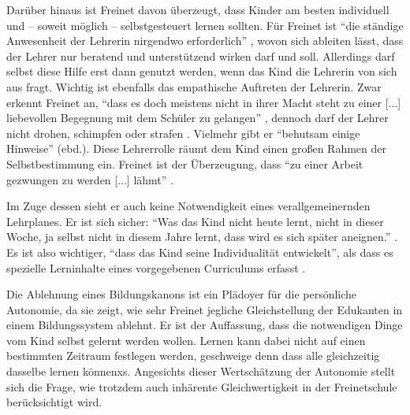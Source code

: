 Darüber hinaus ist Freinet davon überzeugt, dass Kinder am besten individuell und -- soweit möglich -- selbstgesteuert lernen sollten.
Für Freinet ist ``die ständige Anwesenheit der Lehrerin nirgendwo erforderlich'' \parencite[105]{Freinet1979}, wovon sich ableiten lässt, dass der Lehrer nur beratend und unterstützend wirken darf und soll.
Allerdings darf selbst diese Hilfe erst dann genutzt werden, wenn das Kind die Lehrerin von sich aus fragt.
Wichtig ist ebenfalls das empathische Auftreten der Lehrerin.
Zwar erkennt Freinet an, ``dass es doch meistens nicht in ihrer Macht steht zu einer [...] liebevollen Begegnung mit dem Schüler zu gelangen'' \parencite[101]{Freinet1979}, dennoch darf der Lehrer nicht drohen, schimpfen oder strafen \parencite[103]{Freinet1979}.
Vielmehr gibt er ``behutsam einige Hinweise'' (ebd.).
Diese Lehrerrolle räumt dem Kind einen großen Rahmen der Selbstbestimmung ein.
Freinet ist der Überzeugung, dass ``zu einer Arbeit gezwungen zu werden [...] lähmt'' \parencite[vgl.][495]{Freinet-2000a}.

Im Zuge dessen sieht er auch keine Notwendigkeit eines verallgemeinernden Lehrplanes.
Er ist sich sicher: ``Was das Kind nicht heute lernt, nicht in dieser Woche, ja selbst nicht in diesem Jahre lernt, dass wird es sich später aneignen.'' \parencite[101]{Freinet1979}.
Es ist also wichtiger, ``dass das Kind seine Individualität entwickelt'', als dass es spezielle Lerninhalte eines vorgegebenen Curriculums erfasst \parencite[105]{Freinet1979}.

Die Ablehnung eines Bildungskanons ist ein Plädoyer für die persönliche Autonomie, da sie zeigt, wie sehr Freinet jegliche Gleichstellung der Edukanten in einem Bildungssystem ablehnt.
Er ist der Auffassung, dass die notwendigen Dinge vom Kind selbst gelernt werden wollen.
Lernen kann dabei nicht auf einen bestimmten Zeitraum festlegen werden, geschweige denn dass alle gleichzeitig dasselbe lernen könnenxs.
Angesichts dieser Wertschätzung der Autonomie stellt sich die Frage, wie trotzdem auch inhärente Gleichwertigkeit in der Freinetschule berücksichtigt wird.


